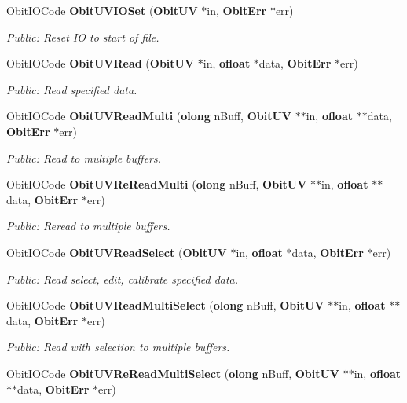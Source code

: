\begin{CompactItemize}
Obit\-IOCode {\bf Obit\-UVIOSet} ({\bf Obit\-UV} $\ast$in, {\bf Obit\-Err} $\ast$err)
\begin{CompactList}\small\item\em Public: Reset IO to start of file. \item\end{CompactList}\item 
Obit\-IOCode {\bf Obit\-UVRead} ({\bf Obit\-UV} $\ast$in, {\bf ofloat} $\ast$data, {\bf Obit\-Err} $\ast$err)
\begin{CompactList}\small\item\em Public: Read specified data. \item\end{CompactList}\item 
Obit\-IOCode {\bf Obit\-UVRead\-Multi} ({\bf olong} n\-Buff, {\bf Obit\-UV} $\ast$$\ast$in, {\bf ofloat} $\ast$$\ast$data, {\bf Obit\-Err} $\ast$err)
\begin{CompactList}\small\item\em Public: Read to multiple buffers. \item\end{CompactList}\item 
Obit\-IOCode {\bf Obit\-UVRe\-Read\-Multi} ({\bf olong} n\-Buff, {\bf Obit\-UV} $\ast$$\ast$in, {\bf ofloat} $\ast$$\ast$data, {\bf Obit\-Err} $\ast$err)
\begin{CompactList}\small\item\em Public: Reread to multiple buffers. \item\end{CompactList}\item 
Obit\-IOCode {\bf Obit\-UVRead\-Select} ({\bf Obit\-UV} $\ast$in, {\bf ofloat} $\ast$data, {\bf Obit\-Err} $\ast$err)
\begin{CompactList}\small\item\em Public: Read select, edit, calibrate specified data. \item\end{CompactList}\item 
Obit\-IOCode {\bf Obit\-UVRead\-Multi\-Select} ({\bf olong} n\-Buff, {\bf Obit\-UV} $\ast$$\ast$in, {\bf ofloat} $\ast$$\ast$data, {\bf Obit\-Err} $\ast$err)
\begin{CompactList}\small\item\em Public: Read with selection to multiple buffers. \item\end{CompactList}\item 
Obit\-IOCode {\bf Obit\-UVRe\-Read\-Multi\-Select} ({\bf olong} n\-Buff, {\bf Obit\-UV} $\ast$$\ast$in, {\bf ofloat} $\ast$$\ast$data, {\bf Obit\-Err} $\ast$err)

\end{CompactItemize}
